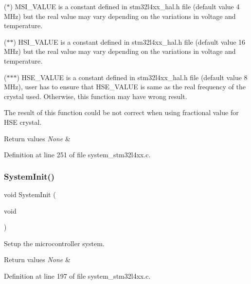($\ast$) M\+S\+I\+\_\+\+V\+A\+L\+UE is a constant defined in stm32l4xx\+\_\+hal.\+h file (default value 4 M\+Hz) but the real value may vary depending on the variations in voltage and temperature.

($\ast$$\ast$) H\+S\+I\+\_\+\+V\+A\+L\+UE is a constant defined in stm32l4xx\+\_\+hal.\+h file (default value 16 M\+Hz) but the real value may vary depending on the variations in voltage and temperature.

($\ast$$\ast$$\ast$) H\+S\+E\+\_\+\+V\+A\+L\+UE is a constant defined in stm32l4xx\+\_\+hal.\+h file (default value 8 M\+Hz), user has to ensure that H\+S\+E\+\_\+\+V\+A\+L\+UE is same as the real frequency of the crystal used. Otherwise, this function may have wrong result.


\begin{DoxyItemize}
\item The result of this function could be not correct when using fractional value for H\+SE crystal.
\end{DoxyItemize}


\begin{DoxyRetVals}{Return values}
{\em None} & \\
\hline
\end{DoxyRetVals}


Definition at line 251 of file system\+\_\+stm32l4xx.\+c.

\mbox{\label{group___s_t_m32_l4xx___system___private___functions_ga93f514700ccf00d08dbdcff7f1224eb2}} 
\subsubsection{\texorpdfstring{System\+Init()}{SystemInit()}}
{\footnotesize\ttfamily void System\+Init (\begin{DoxyParamCaption}\item[{void}]{ }\end{DoxyParamCaption})}



Setup the microcontroller system. 


\begin{DoxyRetVals}{Return values}
{\em None} & \\
\hline
\end{DoxyRetVals}


Definition at line 197 of file system\+\_\+stm32l4xx.\+c.

